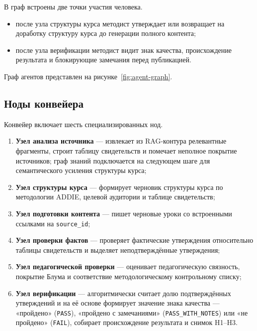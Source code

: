 В граф встроены две точки участия человека.

\begin{itemize}
  \item после узла структуры курса методист утверждает или
    возвращает на доработку структуру курса до генерации полного
    контента;
  \item после узла верификации методист видит знак качества,
    происхождение результата и блокирующие замечания перед публикацией.
\end{itemize}

Граф агентов представлен на рисунке~\ref{fig:agent-graph}.



\subsection{Ноды конвейера}

Конвейер включает шесть специализированных нод.

\begin{enumerate}
  \item \textbf{Узел анализа источника} — извлекает из RAG-контура релевантные
    фрагменты, строит таблицу свидетельств и помечает неполное
    покрытие источников; граф знаний подключается на следующем
    шаге для семантического усиления структуры курса;
  \item \textbf{Узел структуры курса} — формирует
    черновик структуры курса по методологии ADDIE, целевой аудитории
    и таблице свидетельств;
  \item \textbf{Узел подготовки контента} — пишет черновые уроки
    со встроенными ссылками на \texttt{source\_id};
  \item \textbf{Узел проверки фактов} — проверяет фактические утверждения
    относительно таблицы свидетельств и выделяет неподтверждённые утверждения;
  \item \textbf{Узел педагогической проверки} — оценивает педагогическую связность,
    покрытие Блума и соответствие методологическому контрольному списку;
  \item \textbf{Узел верификации} — алгоритмически считает долю
    подтверждённых утверждений и на её основе формирует значение знака
    качества — «пройдено» (\texttt{PASS}),
    «пройдено с замечаниями» (\texttt{PASS\_WITH\_NOTES}) или
    «не пройдено» (\texttt{FAIL}), собирает
    происхождение результата и снимок H1–H3.
\end{enumerate}

